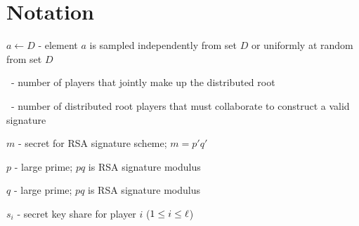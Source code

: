 \section{Notation}
\label{sec:notation}

\begin{itemize*}
\item $a \leftarrow D$ - element $a$ is sampled independently from set
$D$ or uniformly at random from set $D$
\item \nump\ - number of players that jointly make up the distributed root
\item \nums\ - number of distributed root players that must collaborate
to construct a valid signature

\item $m$ - secret for RSA signature scheme; $m=p'q'$
\item $p$ - large prime; $pq$ is RSA signature modulus
\item $q$ - large prime; $pq$ is RSA signature modulus
\item $s_i$ - secret key share for player $i$ ($1 \leq i \leq \ell$)
\end{itemize*}
